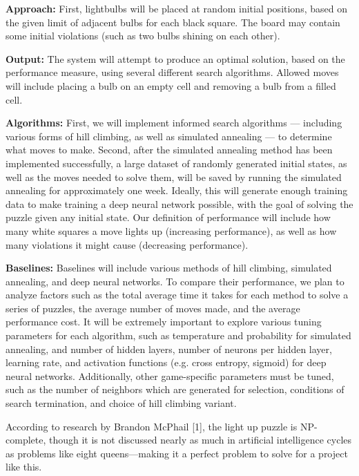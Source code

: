 \documentclass{article} %
\begin{document}
\textbf{Approach:} First, lightbulbs will be placed at random initial positions, based on the given limit of adjacent bulbs for each black square. The board may contain some initial violations (such as two bulbs shining on each other).

\textbf{Output:} The system will attempt to produce an optimal solution, based on the performance measure, using several different search algorithms. Allowed moves will include placing a bulb on an empty cell and removing a bulb from a filled cell.

\textbf{Algorithms:} First, we will implement informed search algorithms — including various forms of hill climbing, as well as simulated annealing — to determine what moves to make. Second, after the simulated annealing method has been implemented successfully, a large dataset of randomly generated initial states, as well as the moves needed to solve them, will be saved by running the simulated annealing for approximately one week. Ideally, this will generate enough training data to make training a deep neural network possible, with the goal of solving the puzzle given any initial state. Our definition of performance will include how many white squares a move lights up (increasing performance), as well as how many violations it might cause (decreasing performance).

\textbf{Baselines:} Baselines will include various methods of hill climbing, simulated annealing, and deep neural networks. To compare their performance, we plan to analyze factors such as the total average time it takes for each method to solve a series of puzzles, the average number of moves made, and the average performance cost. It will be extremely important to explore various tuning parameters for each algorithm, such as temperature and probability for simulated annealing, and number of hidden layers, number of neurons per hidden layer, learning rate, and activation functions (e.g. cross entropy, sigmoid) for deep neural networks. Additionally, other game-specific parameters must be tuned, such as the number of neighbors which are generated for selection, conditions of search termination, and choice of hill climbing variant.

According to research by Brandon McPhail [1], the light up puzzle is NP-complete, though it is not discussed nearly as much in artificial intelligence cycles as problems like eight queens—making it a perfect problem to solve for a project like this.

\newpage
\end{document}
